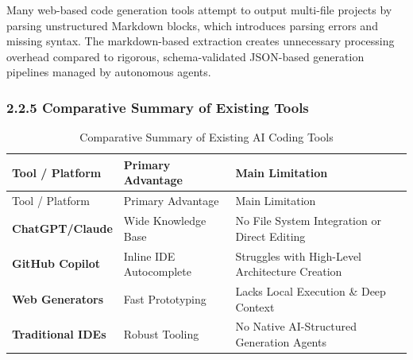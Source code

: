 \documentclass[
  12pt,
]{article}
\begin{document}
Many web-based code generation tools attempt to output multi-file
projects by parsing unstructured Markdown blocks, which introduces
parsing errors and missing syntax. The markdown-based extraction creates
unnecessary processing overhead compared to rigorous, schema-validated
JSON-based generation pipelines managed by autonomous agents.

\subsubsection{2.2.5 Comparative Summary of Existing
Tools}\label{comparative-summary-of-existing-tools}

\begin{longtable}[]{@{}
  >{\raggedright\arraybackslash}p{}
  >{\raggedright\arraybackslash}p{}
  >{\raggedright\arraybackslash}p{}@{}}
\caption{Comparative Summary of Existing AI Coding Tools}\tabularnewline
\toprule\noalign{}
\begin{minipage}[b]{\linewidth}\raggedright
Tool / Platform
\end{minipage} & \begin{minipage}[b]{\linewidth}\raggedright
Primary Advantage
\end{minipage} & \begin{minipage}[b]{\linewidth}\raggedright
Main Limitation
\end{minipage} \\
\midrule\noalign{}
\endfirsthead
\toprule\noalign{}
\begin{minipage}[b]{\linewidth}\raggedright
Tool / Platform
\end{minipage} & \begin{minipage}[b]{\linewidth}\raggedright
Primary Advantage
\end{minipage} & \begin{minipage}[b]{\linewidth}\raggedright
Main Limitation
\end{minipage} \\
\midrule\noalign{}
\endhead
\bottomrule\noalign{}
\endlastfoot
\textbf{ChatGPT/Claude} & Wide Knowledge Base & No File System
Integration or Direct Editing \\
\textbf{GitHub Copilot} & Inline IDE Autocomplete & Struggles with
High-Level Architecture Creation \\
\textbf{Web Generators} & Fast Prototyping & Lacks Local Execution \&
Deep Context \\
\textbf{Traditional IDEs} & Robust Tooling & No Native AI-Structured
Generation Agents \\
\end{longtable}
\end{document}

